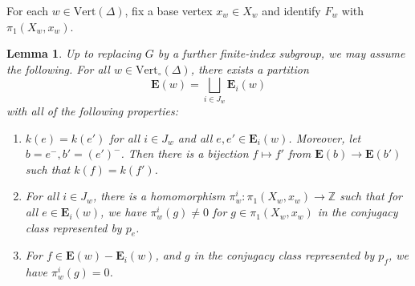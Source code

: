 \documentclass[11pt,oneside]{amsart}
\newtheorem{lem}[thm]{Lemma}
\theoremstyle{definition}
\newcommand{\field}[1]{\mathbb{#1}}
\newcommand{\integers}{\ensuremath{\field{Z}}}
\newcommand{\vertices}{\mathrm{Vert}}
\begin{document}
For each $w\in\vertices(\Delta)$, fix a base vertex $x_w\in X_w$ and identify $F_w$ with $\pi_1(X_w,x_w)$.  

\begin{lem}\label{lem:partition-edges}
Up to replacing $G$ by a further finite-index subgroup, we may assume the following.  For all $w\in\vertices_\circ(\Delta)$, there exists a partition
$$\mathbf E(w)=\bigsqcup_{i\in J_w}\mathbf E_i(w)$$
with all of the following properties:
\begin{enumerate}
    \item \label{item:edge-partition-coeffs}  $k(e)=k(e')$ for all $i\in J_w$ and all $e,e'\in \mathbf E_i(w)$.  Moreover, let $b=e^-,b'=(e')^-$.  Then there is a bijection $f\mapsto f'$ from $\mathbf E(b)\to \mathbf E(b')$ such that $k(f)=k(f')$.
    \item \label{item:edge-partition-maps} For all $i\in J_w$, there is a homomorphism $\pi^i_w:\pi_1(X_w,x_w)\to\integers$ such that for all $e\in \mathbf E_i(w)$, we have $\pi^i_w(g)\neq 0$ for $g\in\pi_1(X_w,x_w)$ in the conjugacy class represented by $p_e$.  
    \item \label{item:edge-partition-kernel} For $f\in\mathbf E(w)-\mathbf E_i(w)$, and $g$ in the conjugacy class represented by $p_f$, we have $\pi^i_w(g)=0$.
\end{enumerate}
\end{lem}
\end{document}
